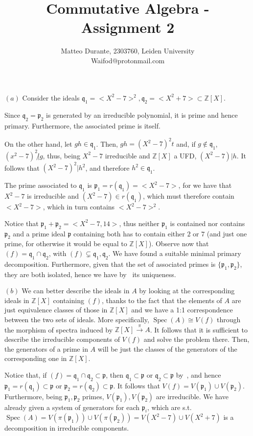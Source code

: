 \documentclass{article}
\newcommand{\numberset}{\mathbb}
\newcommand{\Z}{\numberset{Z}}
\newcommand{\pid}{\mathfrak{p}}
\newcommand{\qid}{\mathfrak{q}}
\newcommand{\exercise}[1]{\noindent {\bf Exercise #1}}
\DeclareMathOperator{\Spec}{Spec}
\begin{document}
\title{Commutative Algebra - Assignment 2}

\author{Matteo Durante, 2303760, Leiden University\\Waifod@protonmail.com}

\maketitle


\exercise{1}

$(a)$ Consider the ideals $\qid_1=<X^2-7>^2,\qid_2=<X^2+7>\subset\Z[X]$.

Since $\qid_2=\pid_2$ is generated by an irreducible polynomial, it is prime and hence primary. Furthermore, the associated prime is itself.

On the other hand, let $gh\in\qid_1$. Then, $gh=(X^2-7)^2t$ and, if $g\not\in\qid_1$, $(x^2-7)^2\not|g$, thus, being $X^2-7$ irreducible and $\Z[X]$ a UFD, $(X^2-7)|h$. It follows that $(X^2-7)^2|h^2$, and therefore $h^2\in\qid_1$.

The prime associated to $\qid_1$ is $\pid_1=r(\qid_1)=<X^2-7>$, for we have that $X^2-7$ is irreducible and $(X^2-7)\in r(\qid_1)$, which must therefore contain $<X^2-7>$, which in turn contains $<X^2-7>^2$.

Notice that $\pid_1+\pid_2=<X^2-7,14>$, thus neither $\pid_1$ is contained nor contains $\pid_2$ and a prime ideal $\pid$ containing both has to contain either $2$ or $7$ (and just one prime, for otherwise it would be equal to $\Z[X]$). Observe now that $(f)=\qid_1\cap\qid_2$, with $(f)\subsetneq\qid_1,\qid_2$. We have found a suitable minimal primary decomposition. Furthermore, given that the set of associated primes is $\{\pid_1,\pid_2\}$, they are both isolated, hence we have by~\cite[cor. 4.11]{atm} its uniqueness.

$(b)$ We can better describe the ideals in $A$ by looking at the corresponding ideals in $\Z[X]$ containing $(f)$, thanks to the fact that the elements of $A$ are just equivalence classes of those in $\Z[X]$ and we have a 1:1 correspondence between the two sets of ideals. More specifically, $\Spec(A)\cong V(f)$ through the morphism of spectra induced by $\Z[X]\xrightarrow{\pi} A$. It follows that it is sufficient to describe the irreducible components of $V(f)$ and solve the problem there. Then, the generators of a prime in $A$ will be just the classes of the generators of the corresponding one in $\Z[X]$.

Notice that, if $(f)=\qid_1\cap\qid_2\subset\pid$, then $\qid_1\subset\pid$ or $\qid_2\subset\pid$ by~\cite[prop. 1.11(ii)]{atm}, and hence $\pid_1=r(\qid_1)\subset\pid$ or $\pid_2=r(\qid_2)\subset\pid$. It follows that $V(f)=V(\pid_1)\cup V(\pid_2)$. Furthermore, being $\pid_1,\pid_2$ primes, $V(\pid_1),V(\pid_2)$ are irreducible. We have already given a system of generators for each $\pid_i$, which are s.t. $\Spec(A)=V(\pi(\pid_1))\cup V(\pi(\pid_2))=V(X^2-7)\cup V(X^2+7)$ is a decomposition in irreducible components.
\end{document}
